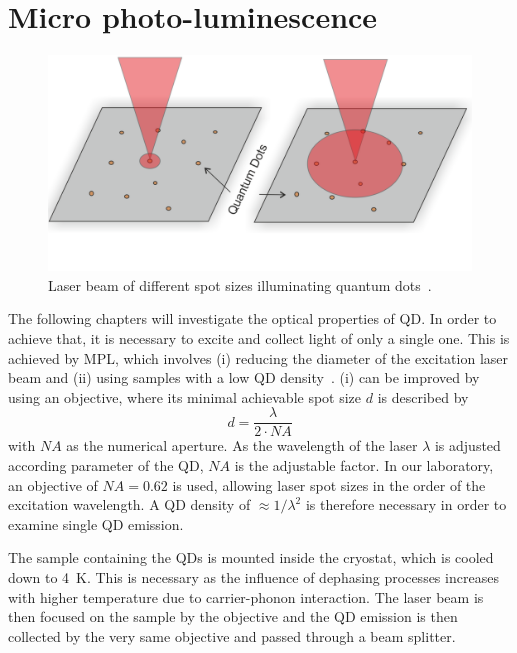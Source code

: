 \section{Micro photo-luminescence}
\begin{figure}[H]
	\centering
	\includegraphics[width=0.7\linewidth]{figures/setup/micro-pl}
	\caption{Laser beam of different spot sizes illuminating quantum dots~\cite{reindl_characterisation_2014}.}
	\label{fig:micro-pl}
\end{figure}
The following chapters will investigate the optical properties of \ac{QD}.
In order to achieve that, it is necessary to excite and collect light of only a single one.
This is achieved by \ac{MPL}, which involves (i) reducing the diameter of the excitation laser beam and (ii) using samples with a low \ac{QD} density~\cite{reindl_characterisation_2014}.
(i) can be improved by using an objective, where its minimal achievable spot size $d$ is described by
\begin{equation}
d = \frac{\lambda}{2 \cdot NA}
\end{equation}
with $NA$ as the numerical aperture.
As the wavelength of the laser $\lambda$ is adjusted according parameter of the \ac{QD}, $NA$ is the adjustable factor.
In our laboratory, an objective of $NA=0.62$ is used, allowing laser spot sizes in the order of the excitation wavelength.
A \ac{QD} density of $\approx 1 / \lambda^2$ is therefore necessary in order to examine single \ac{QD} emission.

The sample containing the \acp{QD} is mounted inside the cryostat, which is cooled down to \SI{4}{\kelvin}.
This is necessary as the influence of dephasing processes increases with higher temperature due to carrier-phonon interaction.
The laser beam is then focused on the sample by the objective and the \ac{QD} emission is then collected by the very same objective and passed through a beam splitter.